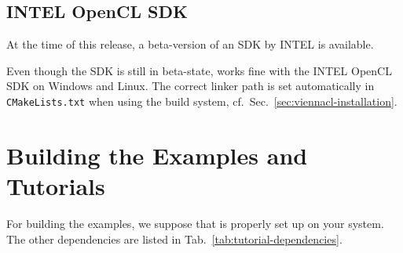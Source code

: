 
\subsection{INTEL OpenCL SDK} \label{sec:opencl-on-intel}
At the time of this release, a beta-version of an {\OpenCL} SDK by INTEL is available.

Even though the SDK is still in beta-state, {\ViennaCL} works fine with the INTEL OpenCL SDK on Windows and Linux.
The correct linker path is set automatically in \lstinline|CMakeLists.txt| when using the {\CMake} build system, cf.~Sec.~\ref{sec:viennacl-installation}.


\section{Building the Examples and Tutorials}
For building the examples, we suppose that {\CMake} is properly set up
on your system. The other dependencies are listed in Tab.~\ref{tab:tutorial-dependencies}.

